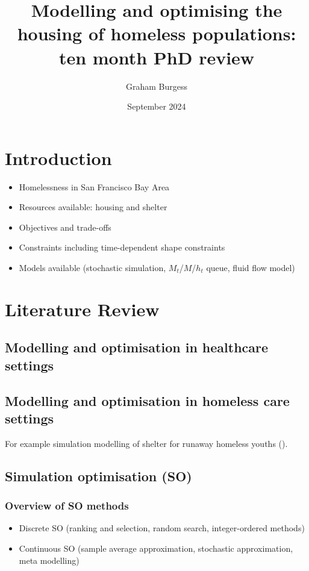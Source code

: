 \message{ !name(TenMonthReview.tex)}\documentclass{article}
\title{Modelling and optimising the housing of homeless populations: ten month PhD review}
\author{Graham Burgess}
\date{September 2024}
\begin{document}


\maketitle

\section{Introduction}

\begin{itemize}
\item Homelessness in San Francisco Bay Area
\item Resources available: housing and shelter
\item Objectives and trade-offs
\item Constraints including time-dependent shape constraints
\item Models available (stochastic simulation, $M_t$/$M$/$h_t$ queue, fluid flow model)
\end{itemize}

\section{Literature Review}

\subsection{Modelling and optimisation in healthcare settings}



\subsection{Modelling and optimisation in homeless care settings}

For example simulation modelling of shelter for runaway homeless youths (\cite{kaya2022discrete}).

\subsection{Simulation optimisation (SO)}

\subsubsection{Overview of SO methods}

\begin{itemize}
\item Discrete SO (ranking and selection, random search, integer-ordered methods)
\item Continuous SO (sample average approximation, stochastic approximation, meta modelling)
\end{itemize}
\end{document}
